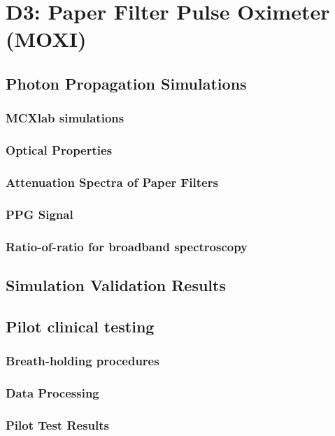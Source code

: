 \section{D3: Paper Filter Pulse Oximeter (MOXI)}
    \subsection{Photon Propagation Simulations}
        \subsubsection{MCXlab simulations}
        \subsubsection{Optical Properties}
        \subsubsection{Attenuation Spectra of Paper Filters}
        \subsubsection{PPG Signal}
        \subsubsection{Ratio-of-ratio for broadband spectroscopy}
    \subsection{Simulation Validation Results}
    \subsection{Pilot clinical testing}
        \subsubsection{Breath-holding procedures}
        \subsubsection{Data Processing}
        \subsubsection{Pilot Test Results}



